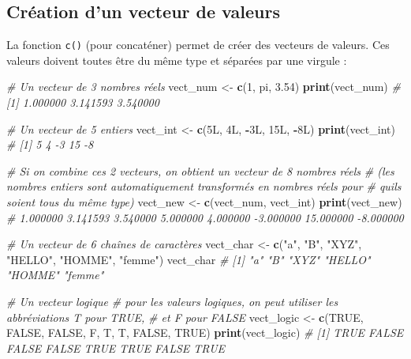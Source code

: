 \documentclass[
]{book}
\newenvironment{Shaded}{\begin{snugshade}}{\end{snugshade}}
\newcommand{\CommentTok}[1]{\textcolor[rgb]{0.56,0.35,0.01}{\textit{#1}}}
\newcommand{\ConstantTok}[1]{\textcolor[rgb]{0.56,0.35,0.01}{#1}}
\newcommand{\DataTypeTok}[1]{\textcolor[rgb]{0.13,0.29,0.53}{#1}}
\newcommand{\DecValTok}[1]{\textcolor[rgb]{0.00,0.00,0.81}{#1}}
\newcommand{\FloatTok}[1]{\textcolor[rgb]{0.00,0.00,0.81}{#1}}
\newcommand{\FunctionTok}[1]{\textcolor[rgb]{0.13,0.29,0.53}{\textbf{#1}}}
\newcommand{\NormalTok}[1]{#1}
\newcommand{\OtherTok}[1]{\textcolor[rgb]{0.56,0.35,0.01}{#1}}
\newcommand{\SpecialCharTok}[1]{\textcolor[rgb]{0.81,0.36,0.00}{\textbf{#1}}}
\newcommand{\StringTok}[1]{\textcolor[rgb]{0.31,0.60,0.02}{#1}}
\begin{document}
\subsection{Création d'un vecteur de valeurs}\label{cruxe9ation-dun-vecteur-de-valeurs}

La fonction \texttt{c()} (pour concaténer) permet de créer des vecteurs de valeurs.
Ces valeurs doivent toutes être du même type et séparées par une virgule :

\begin{Shaded}
\begin{Highlighting}[]
\CommentTok{\# Un vecteur de 3 nombres réels}
\NormalTok{vect\_num }\OtherTok{\textless{}{-}} \FunctionTok{c}\NormalTok{(}\DecValTok{1}\NormalTok{, pi, }\FloatTok{3.54}\NormalTok{)}
\FunctionTok{print}\NormalTok{(vect\_num) }\CommentTok{\# [1] 1.000000 3.141593 3.540000}

\CommentTok{\# Un vecteur de 5 entiers}
\NormalTok{vect\_int }\OtherTok{\textless{}{-}} \FunctionTok{c}\NormalTok{(}\DecValTok{5}\DataTypeTok{L}\NormalTok{, }\DecValTok{4}\DataTypeTok{L}\NormalTok{, }\SpecialCharTok{{-}}\DecValTok{3}\DataTypeTok{L}\NormalTok{, }\DecValTok{15}\DataTypeTok{L}\NormalTok{, }\SpecialCharTok{{-}}\DecValTok{8}\DataTypeTok{L}\NormalTok{) }
\FunctionTok{print}\NormalTok{(vect\_int) }\CommentTok{\# [1]  5  4 {-}3 15 {-}8}

\CommentTok{\# Si on combine ces 2 vecteurs, on obtient un vecteur de 8 nombres réels }
\CommentTok{\# (les nombres entiers sont automatiquement transformés en nombres réels pour }
\CommentTok{\# qu\textquotesingle{}ils soient  tous du même type)}
\NormalTok{vect\_new }\OtherTok{\textless{}{-}} \FunctionTok{c}\NormalTok{(vect\_num, vect\_int)}
\FunctionTok{print}\NormalTok{(vect\_new)}
\CommentTok{\# 1.000000  3.141593  3.540000  5.000000  4.000000 {-}3.000000 15.000000 {-}8.000000}

\CommentTok{\# Un vecteur de 6 chaînes de caractères}
\NormalTok{vect\_char }\OtherTok{\textless{}{-}} \FunctionTok{c}\NormalTok{(}\StringTok{"a"}\NormalTok{, }\StringTok{"B"}\NormalTok{, }\StringTok{"XYZ"}\NormalTok{, }\StringTok{"HELLO"}\NormalTok{, }\StringTok{"HOMME"}\NormalTok{, }\StringTok{"femme"}\NormalTok{)}
\NormalTok{vect\_char }\CommentTok{\# [1] "a"     "B"     "XYZ"   "HELLO" "HOMME" "femme"}

\CommentTok{\# Un vecteur logique}
\CommentTok{\# pour les valeurs logiques, on peut utiliser les abbréviations T pour TRUE,  }
\CommentTok{\# et F pour FALSE}
\NormalTok{vect\_logic }\OtherTok{\textless{}{-}} \FunctionTok{c}\NormalTok{(}\ConstantTok{TRUE}\NormalTok{, }\ConstantTok{FALSE}\NormalTok{, }\ConstantTok{FALSE}\NormalTok{, F, T, T, }\ConstantTok{FALSE}\NormalTok{, }\ConstantTok{TRUE}\NormalTok{)}
\FunctionTok{print}\NormalTok{(vect\_logic) }\CommentTok{\# [1]  TRUE FALSE FALSE FALSE  TRUE  TRUE FALSE  TRUE}


\end{Highlighting}
\end{Shaded}
\end{document}
